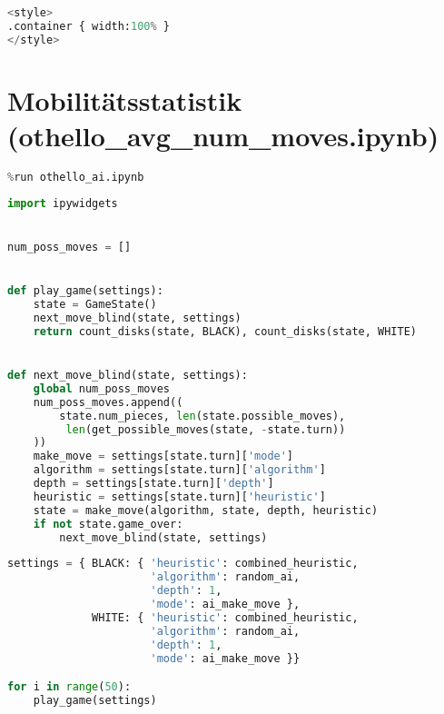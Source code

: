 \begin{lstlisting}[language=Python]
%%HTML
<style>
.container { width:100% }
</style>
\end{lstlisting}

\hypertarget{mobilituxe4tsstatistik-othello_avg_num_moves.ipynb}{%
\section{Mobilitätsstatistik
(othello\_avg\_num\_moves.ipynb)}\label{mobilituxe4tsstatistik-othello_avg_num_moves.ipynb}}

\begin{lstlisting}[language=Python]
%run othello_game.ipynb
%run othello_ai.ipynb
\end{lstlisting}

\begin{lstlisting}[language=Python]
import ipywidgets


num_poss_moves = []


def play_game(settings):
    state = GameState()
    next_move_blind(state, settings)
    return count_disks(state, BLACK), count_disks(state, WHITE)


def next_move_blind(state, settings):
    global num_poss_moves
    num_poss_moves.append((
        state.num_pieces, len(state.possible_moves),
         len(get_possible_moves(state, -state.turn))
    ))
    make_move = settings[state.turn]['mode']
    algorithm = settings[state.turn]['algorithm']
    depth = settings[state.turn]['depth']
    heuristic = settings[state.turn]['heuristic']
    state = make_move(algorithm, state, depth, heuristic)
    if not state.game_over:
        next_move_blind(state, settings)
\end{lstlisting}

\begin{lstlisting}[language=Python]
settings = { BLACK: { 'heuristic': combined_heuristic,
                      'algorithm': random_ai,
                      'depth': 1,
                      'mode': ai_make_move },
             WHITE: { 'heuristic': combined_heuristic,
                      'algorithm': random_ai,
                      'depth': 1,
                      'mode': ai_make_move }}

for i in range(50):
    play_game(settings)
\end{lstlisting}

